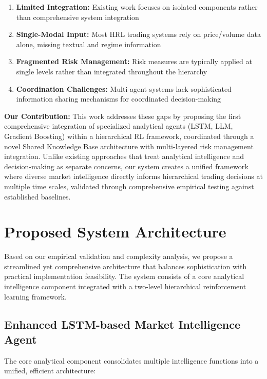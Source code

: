 \documentclass[11pt,a4paper]{article}
\begin{document}
\begin{enumerate}
\item \textbf{Limited Integration:} Existing work focuses on isolated components rather than comprehensive system integration
\item \textbf{Single-Modal Input:} Most HRL trading systems rely on price/volume data alone, missing textual and regime information
\item \textbf{Fragmented Risk Management:} Risk measures are typically applied at single levels rather than integrated throughout the hierarchy
\item \textbf{Coordination Challenges:} Multi-agent systems lack sophisticated information sharing mechanisms for coordinated decision-making

\end{enumerate}
\textbf{Our Contribution:} This work addresses these gaps by proposing the first comprehensive integration of specialized analytical agents (LSTM, LLM, Gradient Boosting) within a hierarchical RL framework, coordinated through a novel Shared Knowledge Base architecture with multi-layered risk management integration. Unlike existing approaches that treat analytical intelligence and decision-making as separate concerns, our system creates a unified framework where diverse market intelligence directly informs hierarchical trading decisions at multiple time scales, validated through comprehensive empirical testing against established baselines.

\section{Proposed System Architecture}

Based on our empirical validation and complexity analysis, we propose a streamlined yet comprehensive architecture that balances sophistication with practical implementation feasibility. The system consists of a core analytical intelligence component integrated with a two-level hierarchical reinforcement learning framework.

\subsection{Enhanced LSTM-based Market Intelligence Agent}

The core analytical component consolidates multiple intelligence functions into a unified, efficient architecture:
\end{document}
